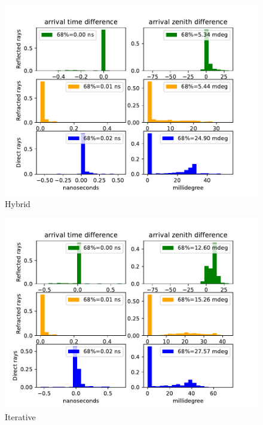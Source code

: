 \documentclass{beamer}
\begin{document}
\begin{frame}
	\begin{minipage}{0.49\textwidth}
	\begin{figure}
		\centering
		\includegraphics[width=\textwidth]{figures/hybrid_comparison_N_500.pdf}
		\caption{Hybrid}
	\end{figure}
	\end{minipage}
	\begin{minipage}{0.49\textwidth}
	\begin{figure}
		\centering
		\includegraphics[width=\textwidth]{figures/iterative_comparison_N_500.pdf}
		\caption{Iterative}
	\end{figure}
	\end{minipage}
\end{frame}
\end{document}
